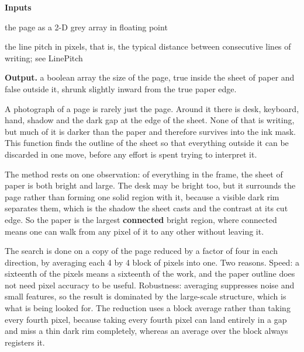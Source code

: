 \noindent\textbf{Inputs}
\begin{description}[leftmargin=2.2em,style=nextline,font=\normalfont\ttfamily]\setlength\itemsep{1pt}
  \item[{g}] \normalfont the page as a 2-D grey array in floating point
  \item[{P}] \normalfont the line pitch in pixels, that is, the typical distance between consecutive lines of writing; see LinePitch
\end{description}

\noindent\textbf{Output.} a boolean array the size of the page, true inside the sheet of paper and false outside it, shrunk slightly inward from the true paper edge.


A photograph of a page is rarely just the page. Around it there is desk, keyboard, hand, shadow and the dark gap at the edge of the sheet. None of that is writing, but much of it is darker than the paper and therefore survives into the ink mask. This function finds the outline of the sheet so that everything outside it can be discarded in one move, before any effort is spent trying to interpret it.


The method rests on one observation: of everything in the frame, the sheet of paper is both bright and large. The desk may be bright too, but it surrounds the page rather than forming one solid region with it, because a visible dark rim separates them, which is the shadow the sheet casts and the contrast at its cut edge. So the paper is the largest \textbf{connected} bright region, where connected means one can walk from any pixel of it to any other without leaving it.


The search is done on a copy of the page reduced by a factor of four in each direction, by averaging each 4 by 4 block of pixels into one. Two reasons. Speed: a sixteenth of the pixels means a sixteenth of the work, and the paper outline does not need pixel accuracy to be useful. Robustness: averaging suppresses noise and small features, so the result is dominated by the large-scale structure, which is what is being looked for. The reduction uses a block average rather than taking every fourth pixel, because taking every fourth pixel can land entirely in a gap and miss a thin dark rim completely, whereas an average over the block always registers it.



